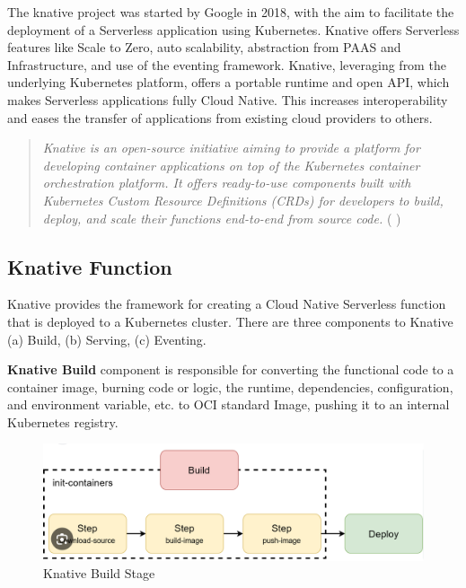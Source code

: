\documentclass{article}
\begin{document}
\begin{flushleft}
The knative project was started by Google in 2018, with the aim to facilitate the deployment of a Serverless application using Kubernetes. Knative offers Serverless features like Scale to Zero, auto scalability, abstraction from \gls{PAAS} and Infrastructure, and use of the eventing framework.
Knative, leveraging from the underlying Kubernetes platform, offers a portable runtime and open API, which makes Serverless applications fully Cloud Native. This increases interoperability and eases the transfer of applications from existing cloud providers to others.
\begin{quote}
    \textit{Knative is an open-source initiative aiming to provide a platform for developing container applications on top of the Kubernetes container orchestration platform. It offers ready-to-use components built with Kubernetes Custom Resource Definitions (\gls{CRD}s) for developers to build, deploy, and scale their functions end-to-end from source code.} ( \cite{lin2019mitigating} )
\end{quote}

\subsection{Knative Function}
Knative provides the framework for creating a Cloud Native Serverless function that is deployed to a Kubernetes cluster. There are three components to Knative (a) Build, (b) Serving, (c) Eventing.

\textbf{Knative Build} component is responsible for converting the functional code to a container image, burning code or logic, the runtime, dependencies, configuration, and environment variable, etc. to \gls{OCI} standard Image, pushing it to an internal Kubernetes registry.
\begin{figure}[h]
    \centering
    \includegraphics[width=0.5\linewidth]{images/knative-build.png}
    \caption{Knative Build Stage}
    \label{Knative_build_stage}
\end{figure}


\end{flushleft}
\end{document}
